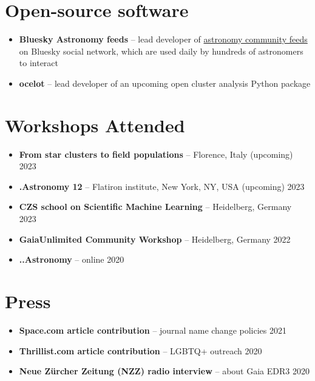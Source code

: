 \documentclass[12pt, letterpaper]{hunt-cv}
\begin{document}
\section*{Open-source software \href{\cvGitHubLink}{\faGithub}}

\begin{itemize}
    \item \textbf{Bluesky Astronomy feeds} -- lead developer of \href{https://github.com/emilyhunt/bluesky-astronomy-feeds}{astronomy community feeds} on Bluesky social network, which are used daily by hundreds of astronomers to interact
    \item \textbf{ocelot} -- lead developer of an upcoming open cluster analysis Python package
\end{itemize}

\section*{Workshops Attended}

\begin{itemize}
    \item \textbf{From star clusters to field populations} -- Florence, Italy \hfill (upcoming) 2023
    \item \textbf{.Astronomy 12} -- Flatiron institute, New York, NY, USA \hfill (upcoming) 2023
    \item \textbf{CZS school on Scientific Machine Learning} -- Heidelberg, Germany \hfill 2023
    \item \textbf{GaiaUnlimited Community Workshop} -- Heidelberg, Germany \hfill 2022
    \item \textbf{..Astronomy} -- online \hfill 2020
\end{itemize}


\section*{Press}

\begin{itemize}
    \item \textbf{Space.com article contribution} -- journal name change policies \hfill 2021
    \item \textbf{Thrillist.com article contribution} -- LGBTQ+ outreach \hfill 2020
    \item \textbf{Neue Zürcher Zeitung (NZZ) radio interview} -- about Gaia EDR3 \hfill 2020
\end{itemize}
\end{document}
